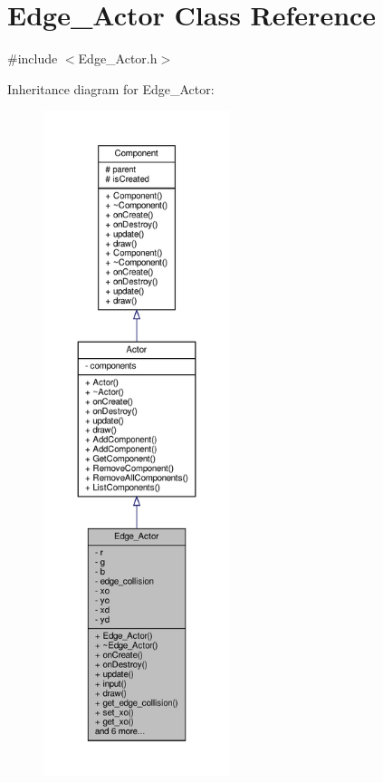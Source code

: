 \hypertarget{classEdge__Actor}{}\section{Edge\+\_\+\+Actor Class Reference}
\label{classEdge__Actor}


{\ttfamily \#include $<$Edge\+\_\+\+Actor.\+h$>$}



Inheritance diagram for Edge\+\_\+\+Actor\+:
\nopagebreak
\begin{figure}[H]
\begin{center}
\leavevmode
\includegraphics[height=550pt]{classEdge__Actor__inherit__graph}
\end{center}
\end{figure}


